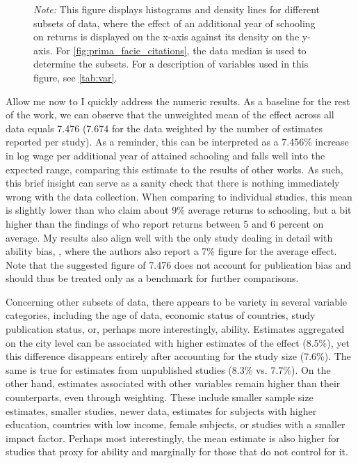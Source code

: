 \begin{figure}[!htbp]
\begin{center}
   \end{center}\vspace{-0.6cm}
   \captionsetup{width=0.75\textwidth, font = scriptsize}
   \caption*{\emph{Note:} This figure displays histograms and density lines for different subsets of data, where the effect of an additional year of schooling on returns is displayed on the x-axis against its density on the y-axis. For \autoref{fig:prima_facie_citations}, the data median is used to determine the subsets. For a description of variables used in this figure, see \autoref{tab:var}.}
\end{figure}


Allow me now to I quickly address the numeric results. As a baseline for the rest of the work, we can observe that the unweighted mean of the effect across all data equals 7.476 (7.674 for the data weighted by the number of estimates reported per study). As a reminder, this can be interpreted as a 7.456\% increase in log wage per additional year of attained schooling and falls well into the expected range, comparing this estimate to the results of other works. As such, this brief insight can serve as a sanity check that there is nothing immediately wrong with the data collection. When comparing to individual studies, this mean is slightly lower than \cite{psacharopoulos2018meta} who claim about 9\% average returns to schooling, but a bit higher than the findings of \cite{fleisher2005meta} who report returns between 5 and 6 percent on average. My results also align well with the only study dealing in detail with ability bias, \cite{wincenciak2022meta}, where the authors also report a 7\% figure for the average effect. Note that the suggested figure of 7.476 does not account for publication bias and should thus be treated only as a benchmark for further comparisons.

Concerning other subsets of data, there appears to be variety in several variable categories, including the age of data, economic status of countries, study publication status, or, perhaps more interestingly, ability. Estimates aggregated on the city level can be associated with higher estimates of the effect (8.5\%), yet this difference disappears entirely after accounting for the study size (7.6\%). The same is true for estimates from unpublished studies (8.3\% vs. 7.7\%). On the other hand, estimates associated with other variables remain higher than their counterparts, even through weighting. These include smaller sample size estimates, smaller studies, newer data, estimates for subjects with higher education, countries with low income, female subjects, or studies with a smaller impact factor. Perhaps most interestingly, the mean estimate is also higher for studies that proxy for ability and marginally for those that do not control for it.

